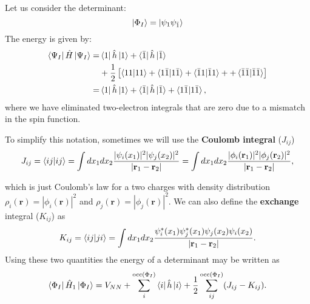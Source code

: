 \documentclass[../Main/chem532-notes.tex]{subfiles}
\begin{document}
\begin{example}
Let us consider the determinant:
\begin{equation}
\ket{\Phi_I} = \ket{\psi_1 \psi_{\bar{1}}}
\end{equation}
The energy is given by:
\begin{equation}
\begin{split}
\bra{\Psi_I} \hat{H} \ket{\Psi_I} =& \bra{1}\hat{h}\ket{1} + \bra{\bar{1}} \hat{h} \ket{\bar{1}} \\
&+ \frac{1}{2} \left[ \braket{11|11} + \braket{1\bar{1} | 1\bar{1}} + \braket{\bar{1}1|\bar{1}1} + + \braket{\bar{1}\bar{1} | \bar{1}\bar{1}}\right] \\
=& \bra{1}\hat{h}\ket{1} + \bra{\bar{1}} \hat{h} \ket{\bar{1}}  + \braket{1\bar{1} | 1\bar{1}},
\end{split}
\end{equation}
where we have eliminated two-electron integrals that are zero due to a mismatch in the spin function.
\end{example}

To simplify this notation, sometimes we will use the \textbf{Coulomb integral} ($J_{ij}$)
\begin{equation}
J_{ij} =\braket{ij|ij} = 
\int dx_1 dx_2 \frac{|\psi_{i}(x_1)|^2 |\psi_{j}(x_2)|^2 }{|\mathbf{r}_1 - \mathbf{r}_2|}
= \int dx_1 dx_2 \frac{|\phi_{i}(\mathbf{r}_1)|^2 |\phi_{j}(\mathbf{r}_2)|^2 }{|\mathbf{r}_1 - \mathbf{r}_2|},
\end{equation}

which is just Coulomb's law for a two charges with density distribution $\rho_i(\mathbf{r}) = |\phi_{i}(\mathbf{r})|^2$ and $\rho_j(\mathbf{r}) = |\phi_{j}(\mathbf{r})|^2$.
We can also define the \textbf{exchange} integral ($K_{ij}$) as
\begin{equation}
K_{ij} =\braket{ij|ji} = 
\int dx_1 dx_2 \frac{\psi_{i}^{*}(x_1) \psi_{j}^{*}(x_1) \psi_{j}(x_2) \psi_{i}(x_2) }{|\mathbf{r}_1 - \mathbf{r}_2|}.
\end{equation}
Using these two quantities the energy of a determinant may be written as
\begin{equation}
\bra{\Phi_I} \hat{H}_1 \ket{\Phi_I} = V_{NN}
+ \sum_i^{\mathrm{occ}(\Phi_I)} \bra{i}\hat{h}\ket{i}
+ \frac{1}{2} \sum_{ij}^{\mathrm{occ}(\Phi_I)} (J_{ij} - K_{ij}).
\end{equation}
\end{document}
